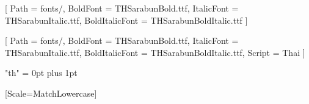\usepackage{fontspec}
\usepackage{iftex}
\usepackage{polyglossia}

\setdefaultlanguage{english}

\setmainfont{THSarabun.ttf}[
    Path = fonts/,
    BoldFont       = THSarabunBold.ttf,
    ItalicFont     = THSarabunItalic.ttf,
    BoldItalicFont = THSarabunBoldItalic.ttf
]

\newfontfamily{}[
    Path = fonts/,
    BoldFont       = THSarabunBold.ttf,
    ItalicFont     = THSarabunItalic.ttf,
    BoldItalicFont = THSarabunBoldItalic.ttf,
    Script = Thai
]

\ifXeTeX
  \XeTeXlinebreaklocale "th"
  \XeTeXlinebreakskip = 0pt plus 1pt
\fi

\AtBeginDocument{\fontsize{16pt}{19.2pt}\selectfont}

\DeclareTextFontCommand{\texttt}{\ttfamily\fontsize{16pt}{19.2pt}\selectfont}

\usepackage{amsmath, amssymb}
\usepackage{unicode-math}
[Scale=MatchLowercase]
\usepackage{etoolbox}
\usepackage{enumitem}
\usepackage{csquotes}
\usepackage[
  backend=biber,
  style=authoryear,
  sorting=nyt,
  maxbibnames=99,
  giveninits=true,
  uniquename=init,
  date=year,
  doi=true,
  isbn=false,
  url=true,
  eprint=false
]{biblatex}


\renewcommand*{\labelnamepunct}{\addperiod\space}
\newlength{\bibhangwidth}
\renewcommand*{\bibfont}{\fontsize{16pt}{19.2pt}\selectfont}
\usepackage{indentfirst}
\usepackage{multirow}


